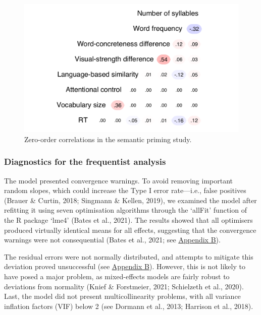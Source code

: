 \documentclass[
  12pt,
  man,floatsintext]{apa7}
\begin{document}
\begin{figure}

{\centering \includegraphics[width=0.65\linewidth]{thesis-core_files/figure-latex/semanticpriming-correlations-1} 

}

\caption{Zero-order correlations in the semantic priming study.}\label{fig:semanticpriming-correlations}
\end{figure}

\hypertarget{diagnostics-for-the-frequentist-analysis}{%
\subsubsection{Diagnostics for the frequentist analysis}\label{diagnostics-for-the-frequentist-analysis}}

The model presented convergence warnings. To avoid removing important random slopes, which could increase the Type I error rate---i.e., false positives (Brauer \& Curtin, 2018; Singmann \& Kellen, 2019), we examined the model after refitting it using seven optimisation algorithms through the `allFit' function of the R package `lme4' (Bates et al., 2021). The results showed that all optimisers produced virtually identical means for all effects, suggesting that the convergence warnings were not consequential (Bates et al., 2021; see \protect\hyperlink{appendix-B-frequentist-analysis-diagnostics}{\underline{Appendix B}}).

The residual errors were not normally distributed, and attempts to mitigate this deviation proved unsuccessful (see \protect\hyperlink{appendix-B-frequentist-analysis-diagnostics}{\underline{Appendix B}}). However, this is not likely to have posed a major problem, as mixed-effects models are fairly robust to deviations from normality (Knief \& Forstmeier, 2021; Schielzeth et al., 2020). Last, the model did not present multicollinearity problems, with all variance inflation factors (VIF) below 2 (see Dormann et al., 2013; Harrison et al., 2018).
\end{document}
